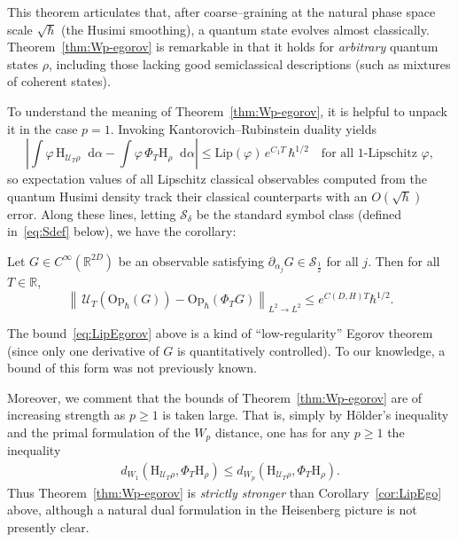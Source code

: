 \documentclass[11pt]{amsart}
\def\Husimi{{\mathrm{H}}}
\def\balpha{\alpha}
\def\Op{\mathrm{Op}}
\def\Real{{\mathbb R}}
\newcommand{\diff}{\mathop{}\!\mathrm{d}}
\newcommand{\mcal}[1]{{\mathcal{#1}}}
\numberwithin{equation}{section}
\begin{document}
This theorem articulates that, after coarse–graining at the natural phase space scale $\sqrt{\hbar}$ (the Husimi smoothing), a quantum state evolves almost classically.  Theorem~\ref{thm:Wp-egorov} is remarkable in that it holds for \textit{arbitrary} quantum states $\rho$, including those lacking good semiclassical descriptions (such as mixtures of coherent states).

To understand the meaning of Theorem~\ref{thm:Wp-egorov}, it is helpful to unpack it in the case $p=1$.
Invoking Kantorovich–Rubinstein duality yields
\[
\left|\int \varphi\,\Husimi_{\mcal U_T\rho} \diff \balpha-\int \varphi\,\Phi_T\Husimi_\rho \diff \balpha\right|
\le \mathrm{Lip}(\varphi)\,e^{C_1 T}\,\hbar^{1/2}
\quad\text{for all $1$-Lipschitz }\varphi,
\]
so expectation values of all Lipschitz classical observables computed from the quantum Husimi density track their classical counterparts with an $O(\sqrt{\hbar})$ error.
Along these lines, letting $\mathcal{S}_{\delta}$ be the standard symbol class (defined in~\eqref{eq:Sdef} below), we have the corollary:
\begin{corollary}
\label{cor:LipEgo}
Let $G\in C^\infty(\Real^{2D})$ be an observable satisfying $\partial_{\alpha_j} G\in \mcal{S}_{\frac12}$ for all $j$.  Then for all $T\in\Real$,
\begin{equation}
\label{eq:LipEgorov}
\left\|\,\mcal{U}_T(\Op_\hbar(G)) - \Op_\hbar(\Phi_T G)\right\|_{L^2\to L^2}
\leq e^{C(D,H) T} \hbar^{1/2}.
\end{equation}
\end{corollary}
The bound~\eqref{eq:LipEgorov} above is a kind of ``low-regularity'' Egorov theorem (since only one derivative of $G$ is quantitatively controlled).
To our knowledge, a bound of this form was not previously known.

Moreover, we comment that the bounds of Theorem~\ref{thm:Wp-egorov} are of increasing strength as $p \geq 1$ is taken large.  That is, simply by H\"{o}lder's inequality and the primal formulation of the $W_p$ distance, one has for any $p\geq 1$ the inequality
\begin{align}
d_{W_1}(\Husimi_{\mcal{U}_T\rho},\Phi_T\Husimi_\rho)
\leq
d_{W_p}(\Husimi_{\mcal{U}_T\rho},\Phi_T\Husimi_\rho).
\end{align}
Thus Theorem~\ref{thm:Wp-egorov} is \textit{strictly stronger} than Corollary~\ref{cor:LipEgo} above, although a natural dual formulation in the Heisenberg picture is not presently clear.
\end{document}
